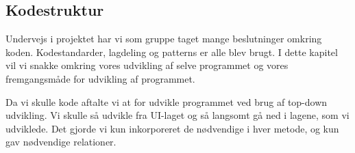 \subsection{Kodestruktur}

Undervejs i projektet har vi som gruppe taget mange beslutninger omkring koden.
Kodestandarder, lagdeling og patterns er alle blev brugt.
I dette kapitel vil vi snakke omkring vores udvikling af selve programmet og vores fremgangsmåde for udvikling af programmet. 

Da vi skulle kode aftalte vi at for udvikle programmet ved brug af top-down udvikling. Vi skulle så udvikle fra UI-laget og så langsomt gå ned i lagene, som vi udviklede. Det gjorde vi kun inkorporeret de nødvendige i hver metode, og kun gav nødvendige relationer.